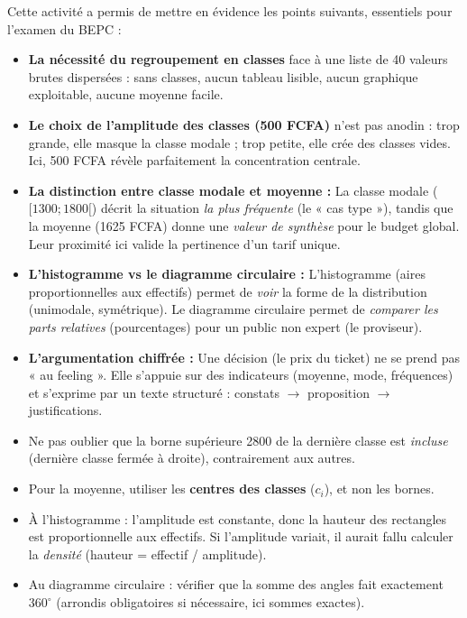 \documentclass[11pt]{article}
\newcounter{popsec}
\newcounter{popsub}
\newcommand{\courssub}[1]{%
  \stepcounter{popsub}%
  \par\vspace{9pt}\noindent{\popxbold\fontsize{11.5}{13}\selectfont\color{popink}{\color{poporange}\thepopsec.\thepopsub}\hspace{6pt}#1}\par\nopagebreak\vspace{4pt}
}
\begin{document}
\courssub{Bilan de l'activité}
Cette activité a permis de mettre en évidence les points suivants, essentiels pour l'examen du BEPC :
\begin{itemize}
    \item \textbf{La nécessité du regroupement en classes} face à une liste de 40 valeurs brutes dispersées : sans classes, aucun tableau lisible, aucun graphique exploitable, aucune moyenne facile.
    \item \textbf{Le choix de l'amplitude des classes (500 FCFA)} n'est pas anodin : trop grande, elle masque la classe modale ; trop petite, elle crée des classes vides. Ici, 500 FCFA révèle parfaitement la concentration centrale.
    \item \textbf{La distinction entre classe modale et moyenne :} La classe modale ($[1300;1800[$) décrit la situation \emph{la plus fréquente} (le « cas type »), tandis que la moyenne (1625 FCFA) donne une \emph{valeur de synthèse} pour le budget global. Leur proximité ici valide la pertinence d'un tarif unique.
    \item \textbf{L'histogramme vs le diagramme circulaire :} L'histogramme (aires proportionnelles aux effectifs) permet de \emph{voir} la forme de la distribution (unimodale, symétrique). Le diagramme circulaire permet de \emph{comparer les parts relatives} (pourcentages) pour un public non expert (le proviseur).
    \item \textbf{L'argumentation chiffrée :} Une décision (le prix du ticket) ne se prend pas « au feeling ». Elle s'appuie sur des indicateurs (moyenne, mode, fréquences) et s'exprime par un texte structuré : constats $\rightarrow$ proposition $\rightarrow$ justifications.
\end{itemize}
\begin{attention}
\begin{itemize}
\item Ne pas oublier que la borne supérieure 2800 de la dernière classe est \emph{incluse} (dernière classe fermée à droite), contrairement aux autres.
\item Pour la moyenne, utiliser les \textbf{centres des classes} ($c_i$), et non les bornes.
\item À l'histogramme : l'amplitude est constante, donc la hauteur des rectangles est proportionnelle aux effectifs. Si l'amplitude variait, il aurait fallu calculer la \emph{densité} (hauteur = effectif / amplitude).
\item Au diagramme circulaire : vérifier que la somme des angles fait exactement $360^\circ$ (arrondis obligatoires si nécessaire, ici sommes exactes).
\end{itemize}
\end{attention}
\end{document}
